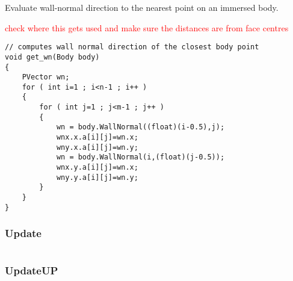 \documentclass[notitlepage]{article}
\begin{document}
Evaluate wall-normal direction to the nearest point on an immersed body.

\textcolor{red}{check where this gets used and make sure the distances are from face centres}

\begin{lstlisting}[style=myCpp]
// computes wall normal direction of the closest body point
void get_wn(Body body)
{
	PVector wn;
	for ( int i=1 ; i<n-1 ; i++ )
	{
		for ( int j=1 ; j<m-1 ; j++ )
		{
			wn = body.WallNormal((float)(i-0.5),j);
			wnx.x.a[i][j]=wn.x;
			wny.x.a[i][j]=wn.y;
			wn = body.WallNormal(i,(float)(j-0.5));
			wnx.y.a[i][j]=wn.x;
			wny.y.a[i][j]=wn.y;
		}
	}   
}
\end{lstlisting}

\subsubsection{Update}

\begin{lstlisting}[style=myCpp]

\end{lstlisting}

\subsubsection{UpdateUP}

\begin{lstlisting}[style=myCpp]

\end{lstlisting}
\end{document}
